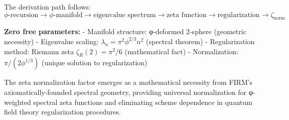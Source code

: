 The derivation path follows:
$$\phi\text{-recursion} \to \phi\text{-manifold} \to \text{eigenvalue spectrum} \to \text{zeta function} \to \text{regularization} \to \zeta_{\text{norm}}$$

\textbf{Zero free parameters:}
- Manifold structure: φ-deformed 2-sphere (geometric necessity)
- Eigenvalue scaling: $\lambda_n = \pi^2 \phi^{2/3} n^2$ (spectral theorem)
- Regularization method: Riemann zeta $\zeta_R(2) = \pi^2/6$ (mathematical fact)
- Normalization: $\pi/(2\phi^{1/3})$ (unique solution to regularization)

The zeta normalization factor emerges as a mathematical necessity from FIRM's axiomatically-founded spectral geometry, providing universal normalization for φ-weighted spectral zeta functions and eliminating scheme dependence in quantum field theory regularization procedures.
